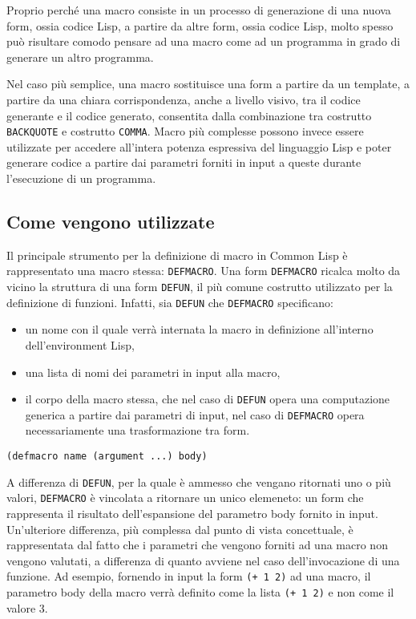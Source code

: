 Proprio perché una macro consiste in un processo di generazione di una nuova
form, ossia codice Lisp, a partire da altre form, ossia codice Lisp, molto
spesso può risultare comodo pensare ad una macro come ad un programma in grado
di generare un altro programma.

Nel caso più semplice, una macro sostituisce una form a partire da un template,
a partire da una chiara corrispondenza, anche a livello visivo, tra il codice
generante e il codice generato, consentita dalla combinazione tra costrutto
\texttt{BACKQUOTE} e costrutto \texttt{COMMA}. Macro più complesse possono
invece essere utilizzate per accedere all’intera potenza espressiva del
linguaggio Lisp e poter generare codice a partire dai parametri forniti in
input a queste durante l’esecuzione di un programma.\\

\subsection{Come vengono utilizzate}

Il principale strumento per la definizione di macro in Common Lisp è
rappresentato una macro stessa: \texttt{DEFMACRO}. Una form \texttt{DEFMACRO}
ricalca molto da vicino la struttura di una form \texttt{DEFUN}, il più comune
costrutto utilizzato per la definizione di funzioni. Infatti, sia
\texttt{DEFUN} che \texttt{DEFMACRO} specificano:

\begin{itemize}

\item un nome con il quale verrà internata la macro in definizione all’interno
  dell’environment Lisp,

\item una lista di nomi dei parametri in input alla macro,

\item il corpo della macro stessa, che nel caso di \texttt{DEFUN} opera una
  computazione generica a partire dai parametri di input, nel caso di
  \texttt{DEFMACRO} opera necessariamente una trasformazione tra form.

\end{itemize}

\begin{lstlisting}[caption=Signature della macro DEFMACRO]
(defmacro name (argument ...) body)
\end{lstlisting}

A differenza di \texttt{DEFUN}, per la quale è ammesso che vengano ritornati
uno o più valori, \texttt{DEFMACRO} è vincolata a ritornare un unico elemeneto:
un form che rappresenta il risultato dell'espansione del parametro body fornito
in input. Un’ulteriore differenza, più complessa dal punto di vista
concettuale, è rappresentata dal fatto che i parametri che vengono forniti ad
una macro non vengono valutati, a differenza di quanto avviene nel caso
dell’invocazione di una funzione. Ad esempio, fornendo in input la form
\texttt{(+ 1 2)} ad una macro, il parametro body della macro verrà definito
come la lista \texttt{(+ 1 2)} e non come il valore 3.\\


